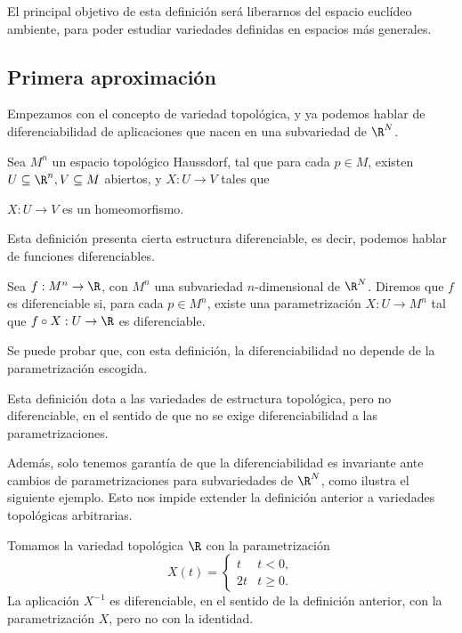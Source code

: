 El principal objetivo de esta definición será liberarnos del espacio euclídeo
ambiente, para poder estudiar variedades definidas en espacios más generales.

\subsection{Primera aproximación}

Empezamos con el concepto de variedad topológica, y ya podemos hablar de
diferenciabilidad de aplicaciones que nacen en una subvariedad de $\R^{N}$.
\begin{ndef}
  Sea $M^{n}$ un espacio topológico Haussdorf, tal que para cada $p\in M$, existen
  $U\subseteq \R^{n}, V\subseteq M$ abiertos, y $X: U\to V$ tales que
  \begin{nlist}
  \item
    $X: U \to V$ es un homeomorfismo.
  \end{nlist}
\end{ndef}

Esta definición presenta cierta estructura diferenciable, es decir, podemos
hablar de funciones diferenciables.
\begin{ndef}
  Sea $f: M^{n} \to \R$, con $M^{n}$ una subvariedad $n$-dimensional de
$\R^{N}$. Diremos que $f$ es diferenciable si, para cada $p\in M^{n}$, existe
una parametrización $X: U\to M^{n}$ tal que $f\circ X: U\to \R$ es
diferenciable.
\end{ndef}
Se puede probar que, con esta definición, la diferenciabilidad no depende de la
parametrización escogida.

Esta definición dota a las variedades de estructura topológica, pero no
diferenciable, en el sentido de que no se exige diferenciabilidad a las
parametrizaciones.

Además, solo tenemos garantía de que la diferenciabilidad es invariante ante
cambios de parametrizaciones para subvariedades de $\R^{N}$, como ilustra el
siguiente ejemplo. Esto nos impide extender la definición anterior a variedades
topológicas arbitrarias.
\begin{ejemplo}
  Tomamos la variedad topológica $\R$ con la parametrización
\[
    X(t) =
  \begin{cases}
    t & t < 0,\\
    2t & t \ge 0.
  \end{cases}
\]
La aplicación $X^{-1}$ es diferenciable, en el sentido de la definición
anterior, con la parametrización $X$, pero no con la identidad.
\end{ejemplo}

